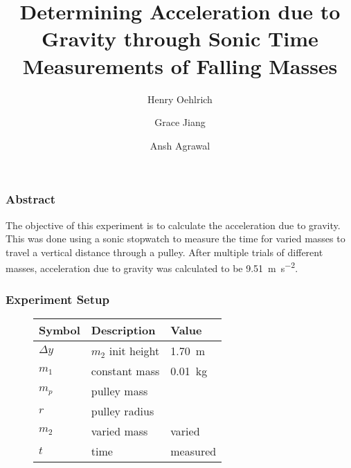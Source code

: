 \documentclass{beamer}
\title{Determining Acceleration due to Gravity through Sonic Time Measurements of Falling Masses}
\author{Henry Oehlrich\and Grace Jiang\and Ansh Agrawal}
\begin{document}
\maketitle

\begin{frame}
    \frametitle{Abstract}
    The objective of this experiment is to calculate the acceleration due to
    gravity. This was done using a sonic stopwatch to measure the time for
    varied masses to travel a vertical distance through a pulley. After
    multiple trials of different masses, acceleration due to gravity was
    calculated to be \qty{9.51}{\meter\per\second\squared}. 
\end{frame}

\begin{frame}
    \frametitle{Experiment Setup}
    \begin{minipage}{0.65\textwidth}
        \begin{figure}
            \centering
            \begin{tabular}{l|l|l}
                \toprule
                Symbol & Description &  Value \\
                \midrule
                $\Delta y$ & $m_2$ init height & \qty{1.70}{\meter} \\
                $m_1$ & constant mass & \qty{0.01}{\kilogram} \\
                $m_p$ & pulley mass & \\
                $r$ & pulley radius & \\
                $m_2$ & varied mass & varied \\
                $t$ & time & measured \\
            \end{tabular}
        \end{figure}
    \end{minipage}%
    \begin{minipage}{0.35\textwidth}
        \begin{figure}
            \centering
        \end{figure}
    \end{minipage}
\end{frame}
\end{document}
